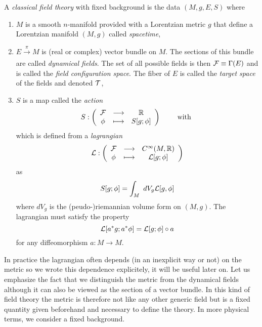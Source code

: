 \documentclass[a4paper,10pt]{article}
\begin{document}
        A \emph{classical field theory} with fixed background is the data $(M,g,E,S)$ where
        \begin{enumerate}
            \item $M$ is a smooth $n$-manifold provided with a Lorentzian metric $g$ that define a Lorentzian manifold $(M,g)$ called \emph{spacetime},
            \item $E\xrightarrow[]{\pi}M$ is (real or complex) vector bundle on $M$. The sections of this bundle are called \emph{dynamical fields}. The set of all possible fields is then $\mathcal{F}\equiv\Gamma(E)$ and is called the \emph{field configuration space}. The fiber of $E$ is called the \emph{target space} of the fields and denoted $\mathcal{T}$,
            \item $S$ is a map called the \emph{action} 
            \begin{equation}
                S:\left(
                \begin{array}{ccc}
                    \mathcal{F} & \longrightarrow & \mathbb{R} \\
                    \phi & \longmapsto & S[g;\phi]
                \end{array}
                \right)\qquad\text{ with }
            \end{equation}
            which is defined from a \emph{lagrangian}
            \begin{equation}
                \mathcal{L}:\left(
                \begin{array}{ccc}
                    \mathcal{F} & \longrightarrow & C^\infty(M,\mathbb{R}) \\
                    \phi & \longmapsto & \mathcal{L}[g;\phi]
                \end{array}
                \right)
            \end{equation}
            as
            \begin{equation}
                S[g;\phi]=\int_M~dV_g\mathcal{L}[g,\phi]
            \end{equation}
            where $dV_g$ is the (peudo-)riemannian volume form on $(M,g)$. The lagrangian must satisfy the property
            \begin{equation}
                \mathcal{L}[a^*g;a^*\phi]=\mathcal{L}[g;\phi]\circ a\label{eq:lagcdt}
            \end{equation}
            for any diffeomorphism $a:M\to M$.
        \end{enumerate}
        In practice the lagrangian often depends (in an inexplicit way or not) on the metric so we wrote this dependence explicitely, it will be useful later on. Let us emphasize the fact that we distinguish the metric from the dynamical fields although it can also be viewed as the section of a vector bundle. In this kind of field theory the metric is therefore not like any other generic field but is a fixed quantity given beforehand and necessary to define the theory. In more physical terms, we consider a fixed background.
\end{document}
